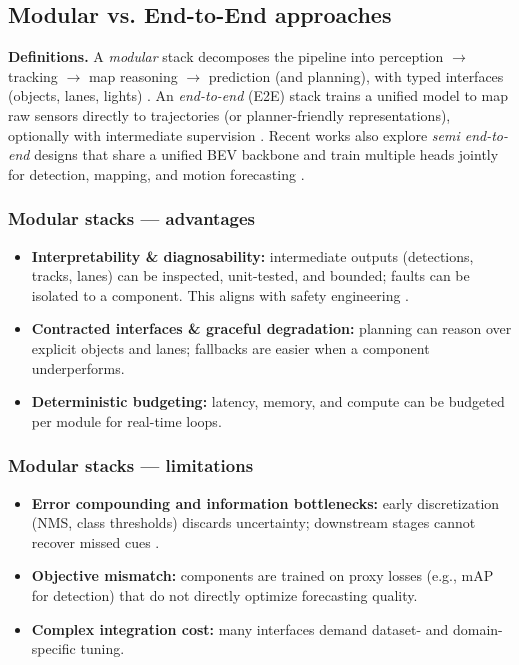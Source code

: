\documentclass[12pt,a4paper]{report}
\begin{document}
\subsection{Modular vs. End-to-End approaches}

\quad \textbf{Definitions.} A \emph{modular} stack decomposes the pipeline into perception $\rightarrow$ tracking $\rightarrow$ map reasoning $\rightarrow$ prediction (and planning), with typed interfaces (objects, lanes, lights) \cite{Wayformer2022,VectorNet2020,TNT2020,DenseTNT2021}. An \emph{end-to-end} (E2E) stack trains a unified model to map raw sensors directly to trajectories (or planner-friendly representations), optionally with intermediate supervision \cite{BEVerse2022,Hu2021FIERY,MultiXNet2020}. Recent works also explore \emph{semi end-to-end} designs that share a unified BEV backbone and train multiple heads jointly for detection, mapping, and motion forecasting \cite{Hu2021FIERY,BEVerse2022}.

\subsubsection{Modular stacks — advantages}
\begin{itemize}
  \item \textbf{Interpretability \& diagnosability:} intermediate outputs (detections, tracks, lanes) can be inspected, unit-tested, and bounded; faults can be isolated to a component. This aligns with safety engineering \cite{ISO21448}.
  \item \textbf{Contracted interfaces \& graceful degradation:} planning can reason over explicit objects and lanes; fallbacks are easier when a component underperforms.
  \item \textbf{Deterministic budgeting:} latency, memory, and compute can be budgeted per module for real-time loops.
\end{itemize}

\subsubsection{Modular stacks — limitations}
\begin{itemize}
  \item \textbf{Error compounding and information bottlenecks:} early discretization (NMS, class thresholds) discards uncertainty; downstream stages cannot recover missed cues \cite{huang2022survey}.
  \item \textbf{Objective mismatch:} components are trained on proxy losses (e.g., mAP for detection) that do not directly optimize forecasting quality.
  \item \textbf{Complex integration cost:} many interfaces demand dataset- and domain-specific tuning.
\end{itemize}
\end{document}
